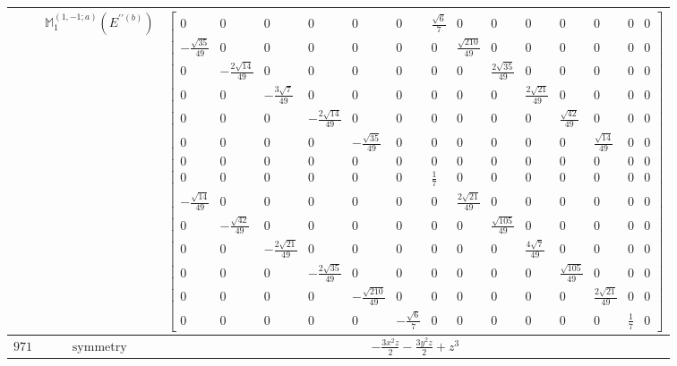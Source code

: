 \documentclass[fleqn,8pt,landscape]{jsarticle}
\begin{document}
\begin{longtable}{ccc}
$  $ & $ \mathbb{M}_{1}^{(1,-1;a)}(E^{\prime\prime(b)}) $ & $ \begin{bmatrix} 0 & 0 & 0 & 0 & 0 & 0 & \frac{\sqrt{6}}{7} & 0 & 0 & 0 & 0 & 0 & 0 & 0 \\ - \frac{\sqrt{35}}{49} & 0 & 0 & 0 & 0 & 0 & 0 & \frac{\sqrt{210}}{49} & 0 & 0 & 0 & 0 & 0 & 0 \\ 0 & - \frac{2 \sqrt{14}}{49} & 0 & 0 & 0 & 0 & 0 & 0 & \frac{2 \sqrt{35}}{49} & 0 & 0 & 0 & 0 & 0 \\ 0 & 0 & - \frac{3 \sqrt{7}}{49} & 0 & 0 & 0 & 0 & 0 & 0 & \frac{2 \sqrt{21}}{49} & 0 & 0 & 0 & 0 \\ 0 & 0 & 0 & - \frac{2 \sqrt{14}}{49} & 0 & 0 & 0 & 0 & 0 & 0 & \frac{\sqrt{42}}{49} & 0 & 0 & 0 \\ 0 & 0 & 0 & 0 & - \frac{\sqrt{35}}{49} & 0 & 0 & 0 & 0 & 0 & 0 & \frac{\sqrt{14}}{49} & 0 & 0 \\ 0 & 0 & 0 & 0 & 0 & 0 & 0 & 0 & 0 & 0 & 0 & 0 & 0 & 0 \\ 0 & 0 & 0 & 0 & 0 & 0 & \frac{1}{7} & 0 & 0 & 0 & 0 & 0 & 0 & 0 \\ - \frac{\sqrt{14}}{49} & 0 & 0 & 0 & 0 & 0 & 0 & \frac{2 \sqrt{21}}{49} & 0 & 0 & 0 & 0 & 0 & 0 \\ 0 & - \frac{\sqrt{42}}{49} & 0 & 0 & 0 & 0 & 0 & 0 & \frac{\sqrt{105}}{49} & 0 & 0 & 0 & 0 & 0 \\ 0 & 0 & - \frac{2 \sqrt{21}}{49} & 0 & 0 & 0 & 0 & 0 & 0 & \frac{4 \sqrt{7}}{49} & 0 & 0 & 0 & 0 \\ 0 & 0 & 0 & - \frac{2 \sqrt{35}}{49} & 0 & 0 & 0 & 0 & 0 & 0 & \frac{\sqrt{105}}{49} & 0 & 0 & 0 \\ 0 & 0 & 0 & 0 & - \frac{\sqrt{210}}{49} & 0 & 0 & 0 & 0 & 0 & 0 & \frac{2 \sqrt{21}}{49} & 0 & 0 \\ 0 & 0 & 0 & 0 & 0 & - \frac{\sqrt{6}}{7} & 0 & 0 & 0 & 0 & 0 & 0 & \frac{1}{7} & 0 \end{bmatrix} $ \\ \hline
$ 971 $ & $ \text{symmetry} $ & $ - \frac{3 x^{2} z}{2} - \frac{3 y^{2} z}{2} + z^{3} $ \\

\end{longtable}
\end{document}
